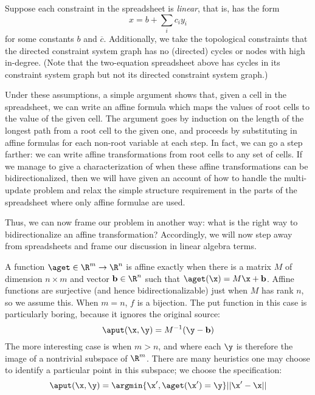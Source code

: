 Suppose each constraint in the spreadsheet is \emph{linear}, that is, has
the form
\[x = b+\sum_ic_iy_i\]
for some constants $b$ and $\overline c$. Additionally, we take the topological
constraints that the directed constraint system graph has no (directed)
cycles or nodes with high in-degree. (Note that the two-equation spreadsheet
above has cycles in its constraint system graph but not its directed
constraint system graph.)

Under these assumptions, a simple argument shows that, given a cell in the
spreadsheet, we can write an affine formula which maps the values of root
cells to the value of the given cell. The argument goes by induction on the
length of the longest path from a root cell to the given one, and proceeds
by substituting in affine formulas for each non-root variable at each step.
In fact, we can go a step farther: we can write affine transformations from
root cells to any set of cells. If we manage to give a characterization of
when these affine transformations can be bidirectionalized, then we will
have given an account of how to handle the multi-update problem and relax
the simple structure requirement in the parts of the spreadsheet where only
affine formulae are used.

Thus, we can now frame our problem in another way: what is the right way to
bidirectionalize an affine transformation? Accordingly, we will now step
away from spreadsheets and frame our discussion in linear algebra terms.

A function $\aget \in \R^m \to \R^n$ is affine exactly when there is a matrix
$M$ of dimension $n \times m$ and vector $\mathbf b \in \R^n$ such that $\aget(\x) =
M\x +\mathbf b$.  Affine functions are surjective (and hence bidirectionalizable)
just when $M$ has rank $n$, so we assume this. When $m=n$, $f$ is a
bijection. The put function in this case is particularly boring, because it
ignores the original source:
\[\aput(\x,\y) = M^{-1}(\y-\mathbf b)\]
The more interesting case is when $m>n$, and where each $\y$ is therefore
the image of a nontrivial subspace of $\R^m$. There are many heuristics one
may choose to identify a particular point in this subspace; we choose the
specification:
\[\aput(\x,\y) = \argmin{\x',\aget(\x')=\y}||\x' - \x||\]

